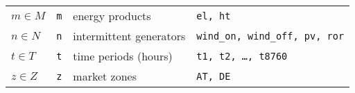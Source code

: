 \documentclass[final, 3p, times]{elsarticle} %
\begin{document}
\begin{table}
\begin{tabulary}{\textwidth}{LLLp{6cm}}
            $m \in M$               & \texttt{m}       & energy products & \texttt{el, ht}                                               \\
            $n \in N$               & \texttt{n}       & intermittent generators & \texttt{wind\_on, wind\_off, pv, ror}                         \\
            $t \in T$               & \texttt{t}       & time periods (hours)               & \texttt{t1, t2, \ldots, t8760}                                \\
            $z \in Z$               & \texttt{z}       & market zones & \texttt{AT, DE}                                               \\
            \bottomrule
        \end{tabulary}
    \end{table}

    \newpage
\end{document}
